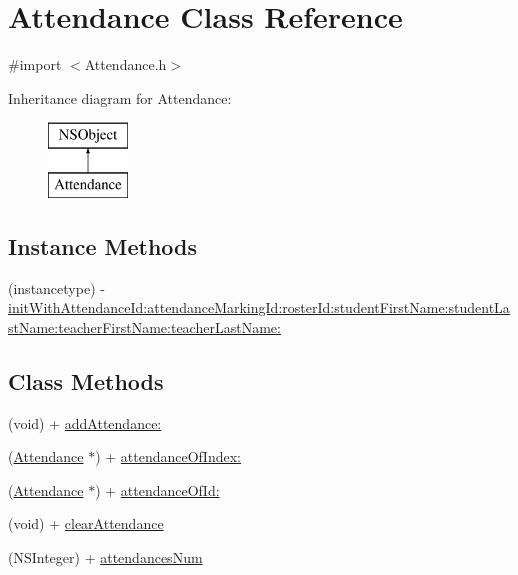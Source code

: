 \hypertarget{interface_attendance}{\section{Attendance Class Reference}
\label{interface_attendance}
}


{\ttfamily \#import $<$Attendance.\+h$>$}

Inheritance diagram for Attendance\+:\begin{figure}[H]
\begin{center}
\leavevmode
\includegraphics[height=2.000000cm]{interface_attendance}
\end{center}
\end{figure}
\subsection*{Instance Methods}
\begin{DoxyCompactItemize}
\item 
(instancetype) -\/ \hyperlink{interface_attendance_a68fb6500814d74c3490f561a7d4cc8d1}{init\+With\+Attendance\+Id\+:attendance\+Marking\+Id\+:roster\+Id\+:student\+First\+Name\+:student\+Last\+Name\+:teacher\+First\+Name\+:teacher\+Last\+Name\+:}
\end{DoxyCompactItemize}
\subsection*{Class Methods}
\begin{DoxyCompactItemize}
\item 
(void) + \hyperlink{interface_attendance_a568770e9ffe9657d639935eef3853fd0}{add\+Attendance\+:}
\item 
(\hyperlink{interface_attendance}{Attendance} $\ast$) + \hyperlink{interface_attendance_a5cb36b2e19d15648d4286c4806205d0f}{attendance\+Of\+Index\+:}
\item 
(\hyperlink{interface_attendance}{Attendance} $\ast$) + \hyperlink{interface_attendance_a3eaa11e5bc98ef472695fd08e6755e19}{attendance\+Of\+Id\+:}
\item 
(void) + \hyperlink{interface_attendance_a80b16d181a194a740fc0c52dede6cbe3}{clear\+Attendance}
\item 
(N\+S\+Integer) + \hyperlink{interface_attendance_a5e9f293e1ce3603c9e795e76a06eac88}{attendances\+Num}
\end{DoxyCompactItemize}
